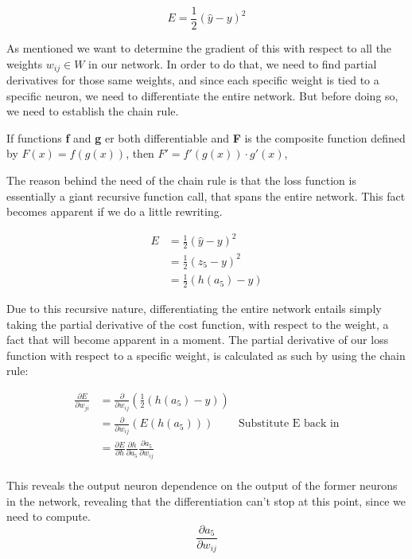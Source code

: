 $$
E = \frac{1}{2}(\hat{y} - y)^2
$$

As mentioned we want to determine the gradient of this with respect to all the
weights $w_{ij} \in W$ in our network. In order to do that, we need to find
partial derivatives for those same weights, and since each specific weight is
tied to a specific neuron, we need to differentiate the entire network. But
before doing so, we need to establish the chain rule.

\begin{lemma}
\label{lemma:chainrule}

    If functions \textbf{f} and \textbf{g} er both differentiable and
    \textbf{F} is the composite function defined by $F(x) = f(g(x))$,
    then $F' = f'(g(x)) \cdot g'(x)$,

\end{lemma}

The reason behind the need of the chain rule is that the loss function
is essentially a giant recursive function call, that spans the entire
network. This fact becomes apparent if we do a little rewriting.

\begin{align}
E &= \frac{1}{2}(\hat{y} - y)^2\\ 
&= \frac{1}{2}(z_5 - y)^2\\
&= \frac{1}{2}(h(a_5) - y) 
\end{align}

Due to this recursive nature, differentiating the entire network entails simply
taking the partial derivative of the cost function, with respect to the weight,
a fact that will become apparent in a moment.
The partial derivative of our loss function with respect to a
specific weight, is calculated as such by using the chain rule:

\begin{align}
\frac{\partial E}{\partial w_{ji}} &= \frac{\partial}{\partial w_{ij}} \left(\frac{1}{2}(h(a_5) - y) \right)\\
&= \frac{\partial}{\partial w_{ij}}\left(E(h(a_5))\right) & \text{Substitute E back in}\\
&= \frac{\partial E}{\partial h}\frac{\partial h}{\partial a_5}\frac{\partial a_5}{\partial w_{ij}}\\
\end{align}

This reveals the output neuron dependence on the output of the former neurons in
the network, revealing that the differentiation can't stop at this point, since we 
need to compute.
$$\frac{\partial a_5}{\partial w_{ij}}$$

